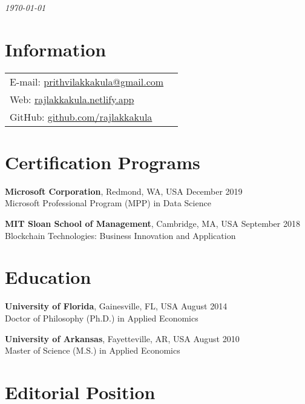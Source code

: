 \documentclass[margin,line]{res}
\begin{document}
 \hfill{\em \today}

\begin{resume}

\section{\sc Information}

\vspace{.05in}
\begin{tabular}{@{}p{3.5in}p{3in}}

{E-mail:} \href{mailto:prithvilakkakula@gmail.com}{prithvilakkakula@gmail.com}\\
{Web:} \href{https://rajlakkakula.netlify.app/}{rajlakkakula.netlify.app}\\
{GitHub:} \href{https://github.com/rajlakkakula}{github.com/rajlakkakula}\\
\end{tabular}

\section{\sc Certification Programs}
{\bf Microsoft Corporation}, Redmond, WA, USA  \hfill December 2019\\
Microsoft Professional Program (MPP) in Data Science \hfill

{\bf MIT Sloan School of Management}, Cambridge, MA, USA \hfill September 2018\\
Blockchain Technologies: Business Innovation and Application \hfill

\section{\sc Education}

{\bf University of Florida}, Gainesville, FL, USA \hfill August 2014\\
Doctor of Philosophy (Ph.D.) in Applied Economics \hfill


{\bf University of Arkansas}, Fayetteville, AR, USA \hfill August 2010 \\
Master of Science (M.S.) in Applied Economics \hfill 

\section{\sc Editorial Position}



\end{resume}
\end{document}
